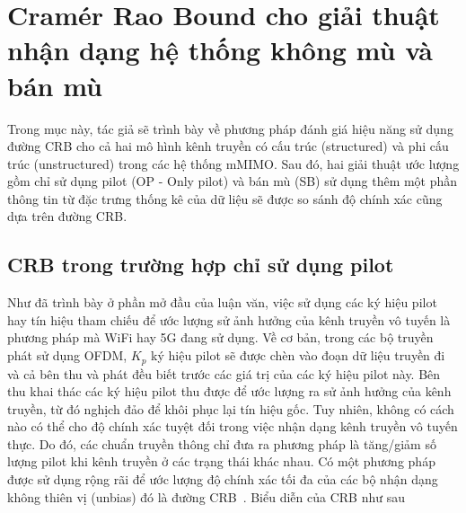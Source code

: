 \section{Cramér Rao Bound cho giải thuật nhận dạng hệ thống không mù và bán mù}\label{CRB}
Trong mục này, tác giả sẽ trình bày về phương pháp đánh giá hiệu năng sử dụng đường CRB cho cả hai mô hình kênh truyền có cấu trúc (structured) và phi cấu trúc (unstructured) trong các hệ thống mMIMO. Sau đó, hai giải thuật ước lượng gồm chỉ sử dụng pilot (OP - Only pilot) và bán mù (SB) sử dụng thêm một phần thông tin từ đặc trưng thống kê của dữ liệu sẽ được so sánh độ chính xác cũng dựa trên đường CRB. 
\subsection{CRB trong trường hợp chỉ sử dụng pilot}

Như đã trình bày ở phần mở đầu của luận văn, việc sử dụng các ký hiệu pilot hay tín hiệu tham chiếu để ước lượng sử ảnh hưởng của kênh truyền vô tuyến là phương pháp mà WiFi hay 5G đang sử dụng. Về cơ bản, trong các bộ truyền phát sử dụng OFDM, $K_p$ ký hiệu pilot sẽ được chèn vào đoạn dữ liệu truyền đi và cả bên thu và phát đều biết trước các giá trị của các ký hiệu pilot này. Bên thu khai thác các ký hiệu pilot thu được để ước lượng ra sử ảnh hưởng của kênh truyền, từ đó nghịch đảo để khôi phục lại tín hiệu gốc. Tuy nhiên, không có cách nào có thể cho độ chính xác tuyệt đối trong việc nhận dạng kênh truyền vô tuyến thực. Do đó, các chuẩn truyền thông chỉ đưa ra phương pháp là tăng/giảm số lượng pilot khi kênh truyền ở các trạng thái khác nhau. Có một phương pháp được sử dụng rộng rãi để ước lượng độ chính xác tối đa của các bộ nhận dạng không thiên vị (unbias) đó là đường CRB~\cite{Kay1993}. Biểu diễn của CRB như sau

